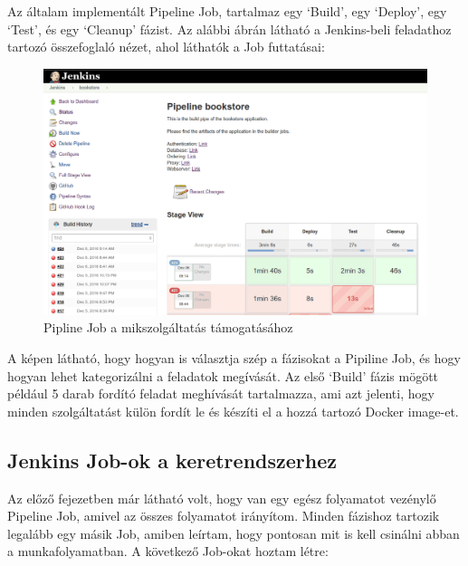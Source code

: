 \documentclass[11pt,magyar,a4paper,twoside,]{report}
\let\Oldincludegraphics\includegraphics
\renewcommand{\includegraphics}[1]{
\begin{adjustbox}{max size={\textwidth}{\textheight}}
    \Oldincludegraphics[scale=0.6]{#1}%
\end{adjustbox}
}
\begin{document}
Az általam implementált Pipeline Job, tartalmaz egy `Build', egy
`Deploy', egy `Test', és egy `Cleanup' fázist. Az alábbi ábrán látható a
Jenkins-beli feladathoz tartozó összefoglaló nézet, ahol láthatók a Job
futtatásai:

\begin{figure}[H]
\centering
\includegraphics{img/pipeline-job.png}
\caption{Pipline Job a mikszolgáltatás támogatásához}
\end{figure}

A képen látható, hogy hogyan is választja szép a fázisokat a Pipiline
Job, és hogy hogyan lehet kategorizálni a feladatok megívását. Az első
`Build' fázis mögött például 5 darab fordító feladat meghívását
tartalmazza, ami azt jelenti, hogy minden szolgáltatást külön fordít le
és készíti el a hozzá tartozó Docker image-et.

\subsection{Jenkins Job-ok a
keretrendszerhez}\label{jenkins-job-ok-a-keretrendszerhez}

Az előző fejezetben már látható volt, hogy van egy egész folyamatot
vezénylő Pipeline Job, amivel az összes folyamatot irányítom. Minden
fázishoz tartozik legalább egy másik Job, amiben leírtam, hogy pontosan
mit is kell csinálni abban a munkafolyamatban. A következő Job-okat
hoztam létre:
\end{document}
